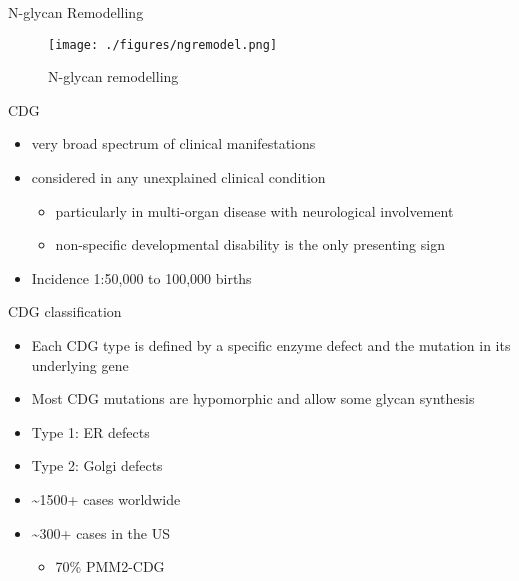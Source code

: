 \documentclass[presentation, smaller]{beamer}
\begin{document}
\begin{frame}[label={sec:orgbe60255}]{N-glycan Remodelling}
\begin{figure}[htbp]
\centering
\texttt{[image: ./figures/ngremodel.png]}
\caption{\label{fig:org95ac5d1}
N-glycan remodelling}
\end{figure}
\end{frame}

\begin{frame}[label={sec:orgfe39b41}]{CDG}
\begin{itemize}
\item very broad spectrum of clinical manifestations
\item considered in any unexplained clinical condition
\begin{itemize}
\item particularly in multi-organ disease with neurological involvement
\item non-specific developmental disability is the only presenting sign
\end{itemize}
\item Incidence 1:50,000 to 100,000 births
\end{itemize}
\end{frame}

\begin{frame}[label={sec:orgc15db78}]{CDG classification}
\begin{itemize}
\item Each CDG type is defined by a specific enzyme defect and the mutation in its underlying gene
\item Most CDG mutations are hypomorphic and allow some glycan synthesis
\item Type 1: ER defects
\item Type 2: Golgi defects
\item \textasciitilde{}1500+ cases worldwide
\item \textasciitilde{}300+ cases in the US
\begin{itemize}
\item 70\% PMM2-CDG
\end{itemize}
\end{itemize}
\end{frame}
\end{document}
